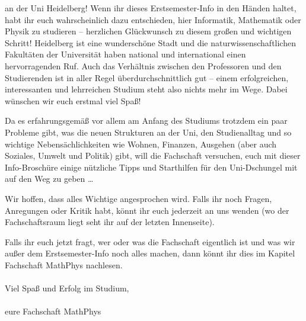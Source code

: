  an der Uni Heidelberg! Wenn ihr dieses Erstsemester-Info in den Händen haltet,
 habt ihr euch wahrscheinlich dazu entschieden, hier Informatik, Mathematik
 oder Physik zu studieren -- herzlichen Glückwunsch zu diesem großen und
 wichtigen Schritt! Heidelberg ist eine wunderschöne Stadt und die
 naturwissenschaftlichen Fakultäten der Universität haben national und
 international einen hervorragenden Ruf. Auch das Verhältnis zwischen den
 Professoren und den Studierenden ist in aller Regel überdurchschnittlich gut
 -- einem erfolgreichen, interessanten und lehrreichen Studium steht also
 nichts mehr im Wege. Dabei wünschen wir euch erstmal viel Spaß! \smiley

Da es erfahrungsgemäß vor allem am Anfang des Studiums trotzdem ein
paar Probleme gibt, was die neuen Strukturen an der Uni, den
Studienalltag und so wichtige Nebensächlichkeiten wie Wohnen,
Finanzen, Ausgehen (aber auch Soziales, Umwelt und Politik) gibt, will
die Fachschaft versuchen, euch mit dieser Info-Broschüre einige
nützliche Tipps und Starthilfen für den Uni-Dschungel mit auf den Weg
zu geben \dots


Wir hoffen, dass alles Wichtige angesprochen wird. Falls ihr noch
Fragen, Anregungen oder Kritik habt, könnt ihr euch jederzeit an uns
wenden (wo der Fachschaftsraum liegt seht ihr auf der letzten Innenseite).

Falls ihr euch jetzt fragt, wer oder was die Fachschaft eigentlich ist
und was wir außer dem Erstsemester-Info noch alles machen, dann könnt
ihr dies im Kapitel Fachschaft MathPhys nachlesen. \\\\ \noindent Viel Spaß und Erfolg
im Studium,\\\\

eure Fachschaft MathPhys

